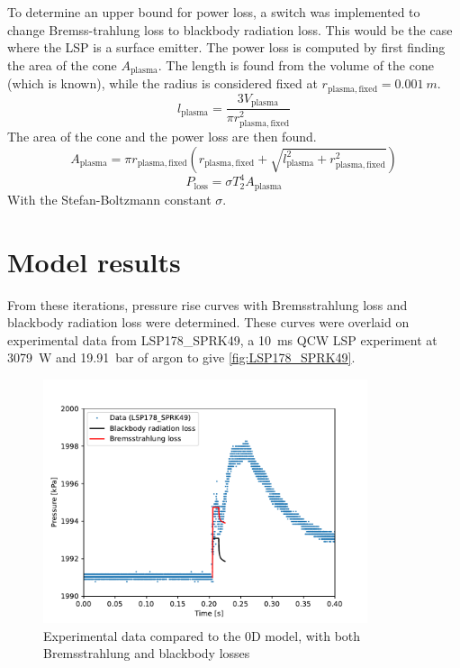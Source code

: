         To determine an upper bound for power loss, a switch was implemented to change Bremss-trahlung loss to blackbody radiation loss. This would be the case where the LSP is a surface emitter. The power loss is computed by first finding the area of the cone $A_\mathrm{plasma}$. The length is found from the volume of the cone (which is known), while the radius is considered fixed at $r_\mathrm{plasma, fixed} = \qty{0.001}{m}$.
        \begin{equation}
            l_\mathrm{plasma} = \frac{3 V_\mathrm{plasma}}{\pi r_\mathrm{plasma, fixed}^2}
        \end{equation}
        The area of the cone and the power loss are then found. 
        \begin{equation}
            A_\mathrm{plasma} = \pi r_\mathrm{plasma, fixed} ( r_\mathrm{plasma, fixed} + \sqrt{l_\mathrm{plasma}^2 + r_\mathrm{plasma, fixed}^2})
        \end{equation}
        \begin{equation}
            P_\mathrm{loss} = \sigma T_2^4 A_\mathrm{plasma}
        \end{equation}
        With the Stefan-Boltzmann constant $\sigma$.
    \section{Model results}

        From these iterations, pressure rise curves with Bremsstrahlung loss and blackbody radiation loss were determined. These curves were overlaid on experimental data from LSP178\_SPRK49, a \qty{10}{ms} QCW LSP experiment at \qty{3079}{W} and \qty{19.91}{bar} of argon to give \autoref{fig:LSP178_SPRK49}.
        
        \begin{figure}[!ht]
            \centering
            \includegraphics[width=0.85\textwidth]{assets/2 models/LSP178_SPRK49.pdf}
            \caption{Experimental data compared to the 0D model, with both Bremsstrahlung and blackbody losses}
            \label{fig:LSP178_SPRK49}
        \end{figure}
        
